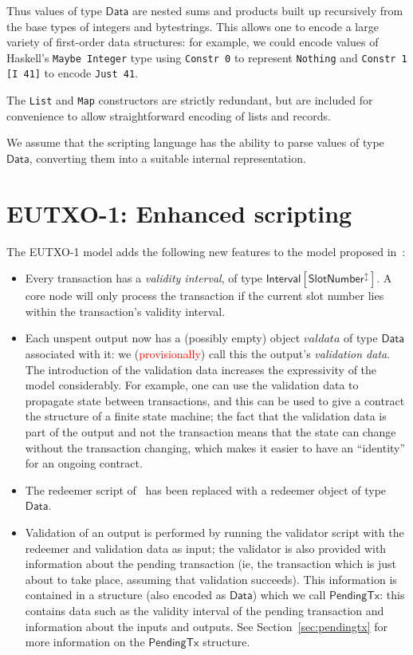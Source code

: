 \documentclass[a4paper]{article}
\newcommand{\red}[1]{\textcolor{red}{#1}}
\newcommand{\s}{\textsf}  %
\newcommand{\mi}[1]{\ensuremath{\mathit{#1}}}
\newcommand{\Interval}[1]{\ensuremath{\s{Interval}[#1]}}
\newcommand{\extended}[1]{#1^\updownarrow}
\newcommand{\ptx}{\ensuremath{\s{PendingTx}}}
\newcommand{\valdata}{\mi{valdata}}
\newcommand{\Data}{\ensuremath{\s{Data}}}
\newcommand{\slotnum}{\ensuremath{\s{SlotNumber}}}
\begin{document}
\noindent Thus values of type \Data{} are nested sums and products
built up recursively from the base types of integers and
bytestrings. This allows one to encode a large variety of first-order
data structures: for example, we could encode values of Haskell's
\verb|Maybe Integer| type using \verb|Constr 0| to represent
\verb|Nothing| and \verb|Constr 1 [I 41]| to encode \verb|Just 41|.


The \texttt{List} and \texttt{Map} constructors are strictly
redundant, but are included for convenience to allow straightforward
encoding of lists and records.

We assume that the scripting language has the ability to parse values
of type \Data{}, converting them into a suitable internal representation.


\section{EUTXO-1: Enhanced scripting}
\label{sec:eutxo-1}
The EUTXO-1 model adds the following new features to the model
proposed in~\citep{Zahnentferner18-UTxO}:




\begin{itemize}
\item Every transaction has a \textit{validity interval}, of type $\Interval{\extended{\slotnum}}$.
  A core node will only process the transaction if
  the current slot number lies within the transaction's validity
  interval.

\item Each unspent output now has a (possibly empty) object $\valdata$ of type
  \Data{} associated with it: we (\red{provisionally}) call this the output's
  \textit{validation data}.  The introduction of the validation data
  increases the expressivity of the model considerably. For example,
  one can use the validation data to propagate state between
  transactions, and this can be used to give a contract the structure
  of a finite state machine; the fact that the validation data is part
  of the output and not the transaction means that the state can
  change without the transaction changing, which makes it easier to
  have an ``identity'' for an ongoing contract.

\item The redeemer script of~\citet{Zahnentferner18-UTxO} has been
  replaced with a redeemer object of type \Data.

\item Validation of an output is performed by running the validator
  script with the redeemer and validation data as input; the validator
  is also provided with information about the pending transaction (ie,
  the transaction which is just about to take place, assuming that
  validation succeeds). This information is contained in a structure
  (also encoded as \Data) which we call \ptx{}: this contains data
  such as the validity interval of the pending transaction and
  information about the inputs and outputs.  See
  Section~\ref{sec:pendingtx} for more information on the \ptx{}
  structure.

\end{itemize}
\end{document}
